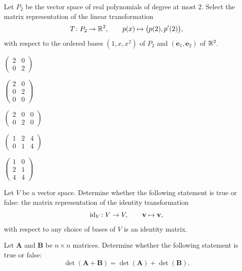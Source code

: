 \begin{problem}
Let $P_2$ be the vector space of real polynomials of degree at most $2$. Select the matrix representation of the linear transformation
\[
T\colon P_2\to\mathbb{R}^2,
\qquad
p(x)\mapsto\bigl(p(2),p'(2)\bigr),
\]
with respect to the ordered bases $(1,x,x^2)$ of $P_2$ and $(\mathbf e_1,\mathbf e_2)$ of $\mathbb{R}^2$.
\begin{problemchoices}
\item $\displaystyle\begin{pmatrix}2&0\\0&2\end{pmatrix}$
\item $\displaystyle\begin{pmatrix}2&0\\0&2\\0&0\end{pmatrix}$
\item $\displaystyle\begin{pmatrix}2&0&0\\0&2&0\end{pmatrix}$
\item $\displaystyle\begin{pmatrix}1&2&4\\0&1&4\end{pmatrix}$
\item $\displaystyle\begin{pmatrix}1&0\\2&1\\4&4\end{pmatrix}$
\end{problemchoices}
\end{problem}

\begin{problem}
Let $V$ be a vector space. Determine whether the following statement is true or false: the matrix representation of the identity transformation
\[
\operatorname{id}_V\colon V\to V,
\qquad
\mathbf v\mapsto\mathbf v,
\]
with respect to any choice of bases of $V$ is an identity matrix.
\end{problem}

\begin{problem}
Let $\mathbf A$ and $\mathbf B$ be $n\times n$ matrices. Determine whether the following statement is true or false:
\[
\det(\mathbf A+\mathbf B)=\det(\mathbf A)+\det(\mathbf B).
\]
\end{problem}

